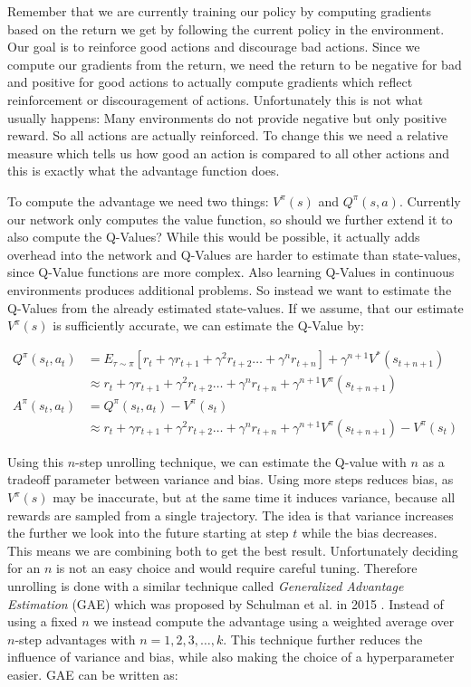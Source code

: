 Remember that we are currently training our policy by computing gradients based on the return we get by following the current policy in the environment. Our goal is to reinforce good actions and discourage bad actions. Since we compute our gradients from the return, we need the return to be negative for bad and positive for good actions to actually compute gradients which reflect reinforcement or discouragement of actions. Unfortunately this is not what usually happens: Many environments do not provide negative but only positive reward. So all actions are actually reinforced. To change this we need a relative measure which tells us how good an action is compared to all other actions and this is exactly what the advantage function does. 

To compute the advantage we need two things: $V^\pi(s)$ and $Q^\pi(s, a)$. Currently our network only computes the value function, so should we further extend it to also compute the Q-Values? While this would be possible, it actually adds overhead into the network and Q-Values are harder to estimate than state-values, since Q-Value functions are more complex. Also learning Q-Values in continuous environments produces additional problems. So instead we want to estimate the Q-Values from the already estimated state-values. If we assume, that our estimate $V^\pi(s)$ is sufficiently accurate, we can estimate the Q-Value by:

\begin{align*}
Q^\pi(s_t, a_t) &= E_{\tau\sim\pi}\left[r_t + \gamma r_{t+1} + \gamma^2 r_{t+2} \dots + \gamma^n r_{t+n}\right] + \gamma^{n+1}V^*(s_{t+n+1}) \\
&\approx r_t + \gamma r_{t+1} + \gamma^2 r_{t+2} \dots + \gamma^n r_{t+n} + \gamma^{n+1}V^\pi(s_{t+n+1}) \\[15pt]
A^\pi(s_t, a_t) &= Q^\pi(s_t, a_t) - V^\pi(s_t) \\
&\approx r_t + \gamma r_{t+1} + \gamma^2 r_{t+2} \dots + \gamma^n r_{t+n} + \gamma^{n+1}V^\pi(s_{t+n+1}) - V^\pi(s_t)
\end{align*}

Using this $n$-step unrolling technique, we can estimate the Q-value with $n$ as a tradeoff parameter between variance and bias. Using more steps reduces bias, as $V^\pi(s)$ may be inaccurate, but at the same time it induces variance, because all rewards are sampled from a single trajectory. The idea is that variance increases the further we look into the future starting at step $t$ while the bias decreases. This means we are combining both to get the best result. Unfortunately deciding for an $n$ is not an easy choice and would require careful tuning. Therefore unrolling is done with a similar technique called \textit{Generalized Advantage Estimation} (GAE) which was proposed by Schulman et al. in 2015 \cite{schulman2015high}. Instead of using a fixed $n$ we instead compute the advantage using a weighted average over $n$-step advantages with $n = 1, 2, 3, \dots, k$. This technique further reduces the influence of variance and bias, while also making the choice of a hyperparameter easier. GAE can be written as:

